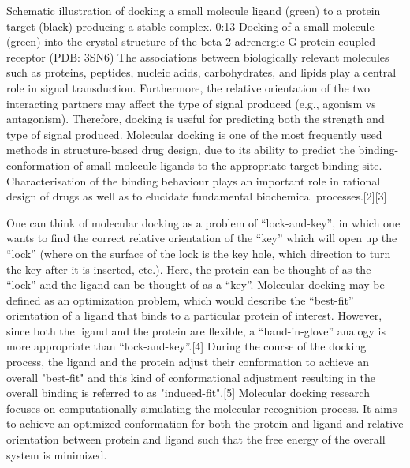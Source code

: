 Schematic illustration of docking a small molecule ligand (green) to a protein target (black) producing a stable complex.
0:13
Docking of a small molecule (green) into the crystal structure of the beta-2 adrenergic G-protein coupled receptor (PDB: 3SN6)
The associations between biologically relevant molecules such as proteins, peptides, nucleic acids, carbohydrates, and lipids play a central role in signal transduction. Furthermore, the relative orientation of the two interacting partners may affect the type of signal produced (e.g., agonism vs antagonism). Therefore, docking is useful for predicting both the strength and type of signal produced.
Molecular docking is one of the most frequently used methods in structure-based drug design, due to its ability to predict the binding-conformation of small molecule ligands to the appropriate target binding site. Characterisation of the binding behaviour plays an important role in rational design of drugs as well as to elucidate fundamental biochemical processes.[2][3]

One can think of molecular docking as a problem of “lock-and-key”, in which one wants to find the correct relative orientation of the “key” which will open up the “lock” (where on the surface of the lock is the key hole, which direction to turn the key after it is inserted, etc.). Here, the protein can be thought of as the “lock” and the ligand can be thought of as a “key”. Molecular docking may be defined as an optimization problem, which would describe the “best-fit” orientation of a ligand that binds to a particular protein of interest. However, since both the ligand and the protein are flexible, a “hand-in-glove” analogy is more appropriate than “lock-and-key”.[4] During the course of the docking process, the ligand and the protein adjust their conformation to achieve an overall "best-fit" and this kind of conformational adjustment resulting in the overall binding is referred to as "induced-fit".[5]
Molecular docking research focuses on computationally simulating the molecular recognition process. It aims to achieve an optimized conformation for both the protein and ligand and relative orientation between protein and ligand such that the free energy of the overall system is minimized.

